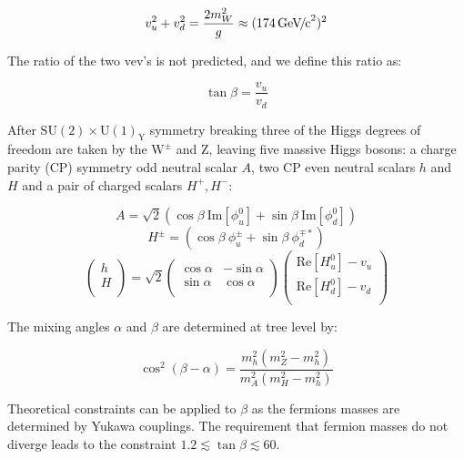 \begin{equation}
	v_{u}^{2} + v_{d}^{2} = \frac{2m_{W}^{2}}{g} \approx (174 {\,\mathrm{Ge\hspace{-.08em}V\hspace{-0.16em}/\hspace{-0.08em}c}^\mathrm{2}})^{2}
\end{equation}

The ratio of the two vev's is not predicted, and we define this ratio as:

\begin{equation}
	\tan\beta = \frac{v_u}{v_d}
\end{equation}

After $\mathrm{SU(2) \times U(1)_{Y}}$ symmetry breaking three of the Higgs degrees of freedom are taken by the $\mathrm{W^{\pm}}$ and Z, leaving five massive Higgs bosons: a charge parity (CP) symmetry odd neutral scalar $A$, two CP even neutral scalars $h$ and $H$ and a pair of charged scalars $H^{+}, H^{-}$:

\begin{equation}
	A = \sqrt{2}(\cos{\beta}\ \mathrm{Im}[\phi^{0}_{u}] + \sin{\beta}\ \mathrm{Im}[\phi^{0}_{d}])
\end{equation}
\begin{equation}
	H^{\pm} = (\cos{\beta}\ \phi^{\pm}_{u} + \sin{\beta}\ \phi^{\mp*}_{d})
\end{equation}
\begin{equation}
	\left(
	\begin{array}{c}
		h \\
		H \\
		\end{array} \right) = \sqrt{2} \left(
	\begin{array}{cc} 
		\cos{\alpha} & -\sin{\alpha} \\ 
		\sin{\alpha} & \cos{\alpha} \\ 
	\end{array} 
	\right)
	\left( \begin{array}{c} 
		\mathrm{Re} [H_{u}^{0}] - v_u\\ 
		\mathrm{Re} [H_{d}^{0}] - v_d \\
	\end{array}
	\right)
\end{equation}

The mixing angles $\alpha$ and $\beta$ are determined at tree level by:

\begin{equation}
	\cos^2{(\beta - \alpha)} = \frac{m_h^2(m_Z^2 - m_h^2)}{m_A^2(m_H^2 - m_h^2)}
	\label{eqn:alpha}
\end{equation}

Theoretical constraints can be applied to $\beta$ as the fermions masses are determined by Yukawa couplings. The requirement that fermion masses do not diverge leads to the constraint $1.2 \lesssim \tan{\beta} \lesssim 60$.~\cite{kane:2002}

